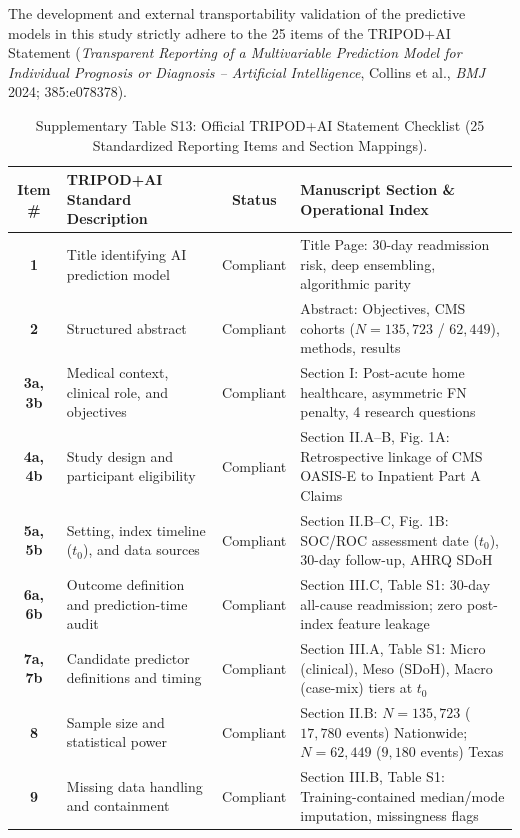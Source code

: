 \documentclass[10pt,journal]{IEEEtran}
\begin{document}
The development and external transportability validation of the predictive models in this study strictly adhere to the 25 items of the TRIPOD+AI Statement (\textit{Transparent Reporting of a Multivariable Prediction Model for Individual Prognosis or Diagnosis -- Artificial Intelligence}, Collins et al., \textit{BMJ} 2024; 385:e078378).

\begin{table}[!t]
\caption{Supplementary Table S13: Official TRIPOD+AI Statement Checklist (25 Standardized Reporting Items and Section Mappings).}
\label{tab:s_tripod_checklist}
\centering
\footnotesize
\begin{tabular}{cp{}cp{}}
\toprule
\textbf{Item \#} & \textbf{TRIPOD+AI Standard Description} & \textbf{Status} & \textbf{Manuscript Section \& Operational Index} \\
\midrule
\textbf{1} & Title identifying AI prediction model & Compliant & Title Page: 30-day readmission risk, deep ensembling, algorithmic parity \\
\textbf{2} & Structured abstract & Compliant & Abstract: Objectives, CMS cohorts ($N=135,723$ / $62,449$), methods, results \\
\textbf{3a, 3b} & Medical context, clinical role, and objectives & Compliant & Section I: Post-acute home healthcare, asymmetric FN penalty, 4 research questions \\
\textbf{4a, 4b} & Study design and participant eligibility & Compliant & Section II.A--B, Fig. 1A: Retrospective linkage of CMS OASIS-E to Inpatient Part A Claims \\
\textbf{5a, 5b} & Setting, index timeline ($t_0$), and data sources & Compliant & Section II.B--C, Fig. 1B: SOC/ROC assessment date ($t_0$), 30-day follow-up, AHRQ SDoH \\
\textbf{6a, 6b} & Outcome definition and prediction-time audit & Compliant & Section III.C, Table S1: 30-day all-cause readmission; zero post-index feature leakage \\
\textbf{7a, 7b} & Candidate predictor definitions and timing & Compliant & Section III.A, Table S1: Micro (clinical), Meso (SDoH), Macro (case-mix) tiers at $t_0$ \\
\textbf{8} & Sample size and statistical power & Compliant & Section II.B: $N=135,723$ ($17,780$ events) Nationwide; $N=62,449$ ($9,180$ events) Texas \\
\textbf{9} & Missing data handling and containment & Compliant & Section III.B, Table S1: Training-contained median/mode imputation, missingness flags \\

\end{tabular}
\end{table}
\end{document}
